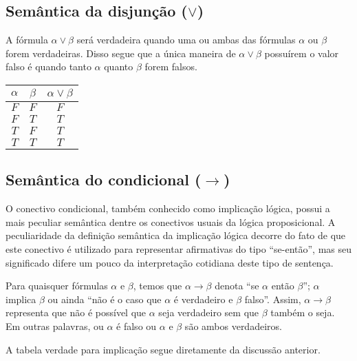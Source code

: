 \subsection{Sem\^antica da disjun\c{c}\~ao ($\lor$)}

A f\'ormula $\alpha\lor\beta$ ser\'a verdadeira quando uma ou ambas
das f\'ormulas $\alpha$ ou $\beta$ forem verdadeiras. Disso segue que
a \'unica maneira de $\alpha\lor\beta$ possu\'irem o valor falso \'e
quando tanto $\alpha$ quanto $\beta$ forem falsos.

\begin{table}[h]
  \begin{tabular}{|c|c|c|}
    \hline
    $\alpha$ & $\beta$ & $\alpha \lor \beta$\\ \hline
    $F$         & $F$        & $F$ \\ \hline
    $F$         & $T$        & $T$ \\ \hline
    $T$         & $F$        & $T$ \\ \hline
    $T$         & $T$        & $T$ \\ \hline
   \end{tabular}
  \centering
\end{table}

\subsection{Sem\^antica do condicional ($\to$)}

O conectivo condicional, tamb\'em conhecido como implica\c{c}\~ao
l\'ogica, possui a mais peculiar sem\^antica dentre os conectivos
usuais da l\'ogica proposicional. A peculiaridade da defini\c{c}\~ao
sem\^antica da implica\c{c}\~ao l\'ogica decorre do fato de que este
conectivo \'e utilizado para representar afirmativas do tipo
``se-ent\~ao'', mas seu significado difere um pouco da
interpreta\c{c}\~ao cotidiana deste tipo de senten\c{c}a.

Para quaisquer f\'ormulas $\alpha$ e $\beta$, temos que
$\alpha\to\beta$ denota ``se $\alpha$ ent\~ao $\beta$''; $\alpha$
implica $\beta$ ou ainda ``n\~ao \'e o caso que $\alpha$ \'e
verdadeiro e $\beta$ falso''. Assim, $\alpha\to\beta$ representa que
n\~ao \'e poss\'ivel que $\alpha$ seja verdadeiro sem que $\beta$
tamb\'em o seja. Em outras palavras, ou $\alpha$ \'e falso ou $\alpha$
e $\beta$ s\~ao ambos verdadeiros.

A tabela verdade para
implica\c{c}\~ao segue diretamente da discuss\~ao anterior.


